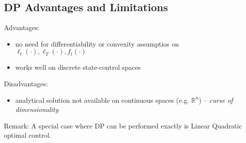 \documentclass[openany]{book}
\newcommand{\R}{\mathbb{R}}               %
\theoremstyle{definition}
\theoremstyle{remark}
\begin{document}
\subsection{DP Advantages and Limitations}
Advantages: 
\begin{itemize}
    \item no need for differentiability or convexity assumptios on $\ell_t(\cdot),\ell_T(\cdot), f_t(\cdot) $
    \item works well on discrete state-control spaces
\end{itemize}
Disadvantages:
\begin{itemize}
    \item analytical solution not available on continuous spaces (e.g. $\R^n$) – \emph{curse of dimensionality}
\end{itemize}
Remark: A special case where DP can be performed exactly is Linear Quadratic optimal control.
\end{document}
